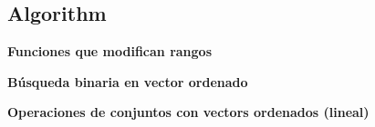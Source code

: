 \subsection{Algorithm}
    \textbf{Funciones que modifican rangos}
    

    \textbf{Búsqueda binaria en vector ordenado}
    

    \textbf{Operaciones de conjuntos con vectors ordenados (lineal)}
    
    